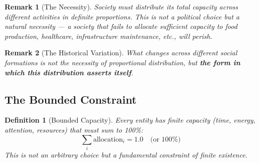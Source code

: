 \documentclass[11pt]{article}
\newtheorem{definition}{Definition}
\newtheorem{remark}{Remark}
\begin{document}
\begin{remark}[The Necessity]
Society must distribute its total capacity across different activities in definite proportions. This is not a political choice but a natural necessity — a society that fails to allocate sufficient capacity to food production, healthcare, infrastructure maintenance, etc., will perish.
\end{remark}

\begin{remark}[The Historical Variation]
What changes across different social formations is not the necessity of proportional distribution, but \textbf{the form in which this distribution asserts itself}.
\end{remark}

\subsection{The Bounded Constraint}

\begin{definition}[Bounded Capacity]
Every entity has finite capacity (time, energy, attention, resources) that must sum to 100\%:
\[
\sum_i \text{allocation}_i = 1.0 \quad \text{(or 100\%)}
\]
This is not an arbitrary choice but a fundamental constraint of finite existence.
\end{definition}
\end{document}
